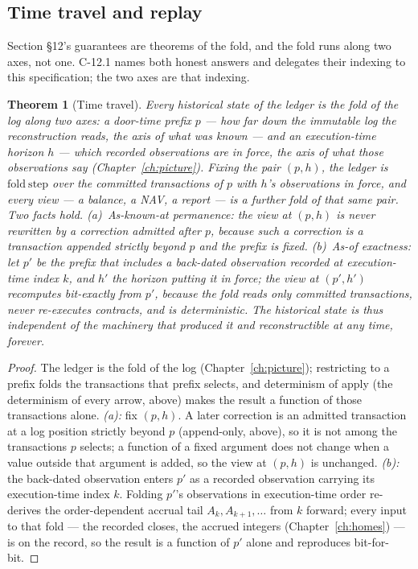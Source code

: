 \documentclass[11pt,a4paper]{article}
\newtheorem{theorem}[definition]{Theorem}
\begin{document}
\subsection{Time travel and replay}

Section \S 12's guarantees are theorems of the fold, and the fold runs along two axes, not
one. C-12.1 names both honest answers and delegates their indexing to this
specification; the two axes are that indexing.

\begin{theorem}[Time travel]\label{thm:timetravel}
Every historical state of the ledger is the fold of the log along two axes: a
door-time prefix $p$ --- how far down the immutable log the reconstruction reads,
the axis of what was known --- and an execution-time horizon $h$ --- which recorded observations
are in force, the axis of what those observations say (Chapter~\ref{ch:picture}). Fixing
the pair $(p,h)$, the ledger is $\mathrm{fold\ step}$ over the committed transactions of
$p$ with $h$'s observations in force, and every view --- a balance, a NAV, a report --- is
a further fold of that same pair. Two facts hold.
\emph{(a)~As-known-at permanence:} the view at $(p,h)$ is never rewritten by a correction
admitted after $p$, because such a correction is a transaction appended strictly beyond $p$
and the prefix is fixed.
\emph{(b)~As-of exactness:} let $p'$ be the prefix that includes a back-dated observation
recorded at execution-time index $k$, and $h'$ the horizon putting it in force; the view at
$(p',h')$ recomputes bit-exactly from $p'$, because the fold reads only committed
transactions, never re-executes contracts, and is deterministic. The historical state is
thus independent of the machinery that produced it and reconstructible at any time, forever.
\end{theorem}

\begin{proof}
The ledger is the fold of the log (Chapter~\ref{ch:picture}); restricting to a prefix folds
the transactions that prefix selects, and determinism of apply (the determinism of every
arrow, above) makes the result a function of those transactions alone. \emph{(a):} fix
$(p,h)$. A later correction is an admitted transaction at a log position strictly beyond $p$
(append-only, above), so it is not among the transactions $p$ selects; a function of a fixed
argument does not change when a value outside that argument is added, so the view at $(p,h)$
is unchanged. \emph{(b):} the back-dated observation enters $p'$ as a recorded observation
carrying its execution-time index $k$. Folding $p'$'s observations in execution-time order re-derives
the order-dependent accrual tail $A_k, A_{k+1}, \dots$ from $k$ forward; every input to that
fold --- the recorded closes, the accrued integers (Chapter~\ref{ch:homes}) --- is on the
record, so the result is a function of $p'$ alone and reproduces bit-for-bit.
\end{proof}
\end{document}
